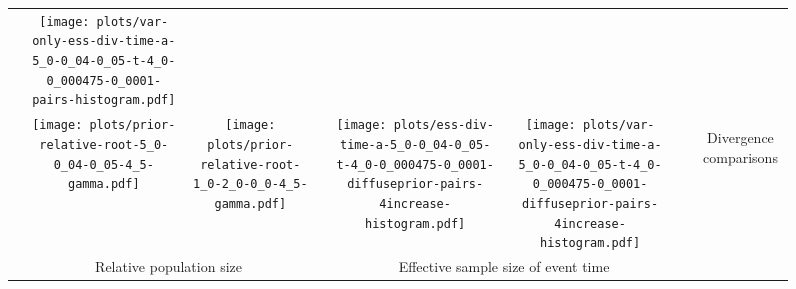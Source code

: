 \documentclass[border=10pt,varwidth=30cm]{standalone}
\begin{document}
\begin{figure}
\begin{tabular}{@{}cccccccc@{}}
        & \texttt{[image: plots/var-only-ess-div-time-a-5\_0-0\_04-0\_05-t-4\_0-0\_000475-0\_0001-pairs-histogram.pdf]}
        & \multicolumn{1}{c|}{}
        & \\
        & \texttt{[image: plots/prior-relative-root-5\_0-0\_04-0\_05-4\_5-gamma.pdf]}
        & \texttt{[image: plots/prior-relative-root-1\_0-2\_0-0\_0-4\_5-gamma.pdf]}
        &
        & \texttt{[image: plots/ess-div-time-a-5\_0-0\_04-0\_05-t-4\_0-0\_000475-0\_0001-diffuseprior-pairs-4increase-histogram.pdf]}
        & \texttt{[image: plots/var-only-ess-div-time-a-5\_0-0\_04-0\_05-t-4\_0-0\_000475-0\_0001-diffuseprior-pairs-4increase-histogram.pdf]}
        & \multicolumn{1}{c|}{}
        & \multirow{5}{*}[16.5em]{\begin{sideways}\Large Divergence comparisons\end{sideways}} \\
        & \multicolumn{2}{c}{\large Relative population size}
        &
        & \multicolumn{2}{c}{\large Effective sample size of event time}
        &
        & \\
    \end{tabular}
\end{figure}
\end{document}
